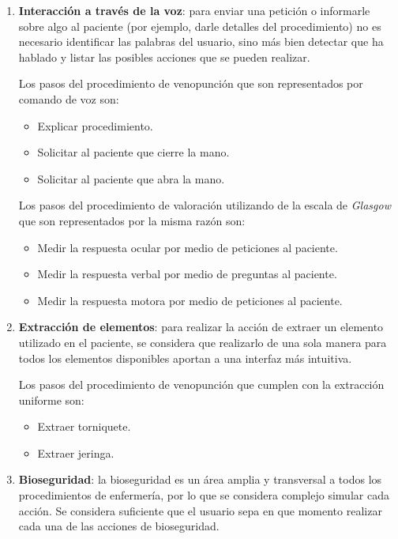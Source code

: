 \begin{enumerate}[label=\bfseries H\arabic*:]

\item \textbf{Interacción a través de la voz}: para enviar una petición o
    informarle sobre algo al paciente (por ejemplo, darle detalles del
    procedimiento) no es necesario identificar las palabras del usuario, sino
    más bien detectar que ha hablado y listar las posibles acciones que se
    pueden realizar.
    
    Los pasos del procedimiento de venopunción que son representados por 
    comando de voz son:
    
    \begin{itemize}
        \item Explicar procedimiento.
        \item Solicitar al paciente que cierre la mano.
        \item Solicitar al paciente que abra la mano.
    \end{itemize}
    
    Los pasos del procedimiento de valoración utilizando de la escala de \emph{Glasgow} 
    que son representados por la misma razón son:
    
    \begin{itemize}
        \item Medir la respuesta ocular por medio de peticiones al paciente.
        \item Medir la respuesta verbal por medio de preguntas al paciente.
        \item Medir la respuesta motora por medio de peticiones al paciente.
    \end{itemize}

\item \textbf{Extracción de elementos}: para realizar la acción de
    extraer un elemento utilizado en el paciente, se considera que realizarlo de
    una sola manera para todos los elementos disponibles aportan a una interfaz más
    intuitiva.

    Los pasos del procedimiento de venopunción que cumplen con la extracción 
    uniforme son:
    
    \begin{itemize}
        \item Extraer torniquete.
        \item Extraer jeringa.
    \end{itemize}
    
\item \textbf{Bioseguridad}: la bioseguridad es un área amplia y transversal a
    todos los procedimientos de enfermería, por lo que se considera complejo
    simular cada acción. Se considera suficiente que el usuario sepa en que momento
    realizar cada una de las acciones de bioseguridad. 
    

\end{enumerate}
